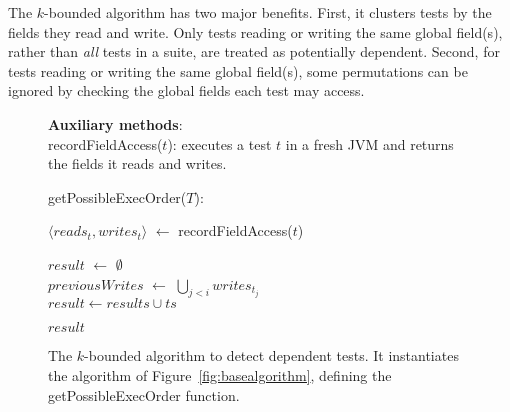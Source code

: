 The \dependenceaware{} $k$-bounded algorithm has two major benefits.
First, it clusters tests by the fields they
read and write. Only tests reading or writing
the same global field(s), rather than \textit{all} tests
in a suite, are treated as potentially dependent.
Second, for tests reading or writing the same global
field(s), some permutations can be ignored by checking
the global fields each test may access. 

\begin{figure}[t]
\textbf{Auxiliary methods}:\\
recordFieldAccess($\mathit{t}$): executes a test $\mathit{t}$ in
a fresh JVM and returns the fields it reads and writes.\\


\vspace{-2mm}

getPossibleExecOrder($T$):\\
\vspace{-5mm}
\begin{algorithmic}[1]
\STATE $\langle \mathit{reads}_t, \mathit{writes}_t\rangle$ $\leftarrow$ recordFieldAccess($\mathit{t}$)\\ 
\ENDFOR

\STATE $\mathit{result}$ $\leftarrow$ $\emptyset$ \\
		\STATE $\mathit{previousWrites}$ $\leftarrow$ $\bigcup_{\mathit{j} < \mathit{i}}  \mathit{writes}_{t_j} $ \\
			\STATE $\mathit{result} \leftarrow \mathit{results} \cup \mathit{ts}$
		\ENDIF
	\ENDFOR

\ENDFOR
\RETURN $\mathit{result}$
\end{algorithmic}

\vspace{-3mm}
\caption {The \dependenceaware{} $k$-bounded algorithm to detect dependent tests.
It instantiates the algorithm of Figure~\ref{fig:basealgorithm}, defining the
getPossibleExecOrder function.
} 
\label{fig:impralg}
\end{figure}


